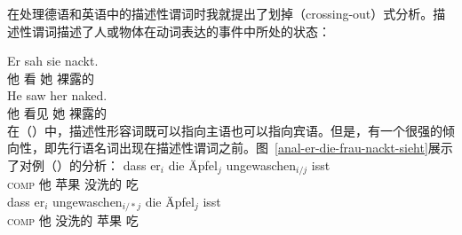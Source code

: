 在处理德语和英语中的描述性谓词时我就提出了划掉（crossing-out）式分析\citep{Mueller2004c,Mueller2008a}。描述性谓词描述了人或物体在动词表达的事件中所处的状态：

\eal
\ex 
\gll Er sah sie nackt.\footnotemark\\
	他 看 她 裸露的\\
\ex 
\gll He saw her naked.\\
	他 看见 她 裸露的\\
\zl
在（）中，描述性形容词既可以指向主语也可以指向宾语。但是，有一个很强的倾向性，即先行语名词出现在描述性谓词之前\citep[]{Loetscher85a}。图~\vref{anal-er-die-frau-nackt-sieht}展示了对例（）的分析：
\addlines[-1]
\eal
\ex 
\gll dass er$_i$ die Äpfel$_j$ ungewaschen$_{i/j}$ isst\\
	 \textsc{comp} 他  苹果 没洗的 吃\\
\ex 
\gll dass er$_i$ ungewaschen$_{i/*j}$ die Äpfel$_j$ isst\\
	 \textsc{comp} 他 没洗的  苹果 吃\\
\zl
